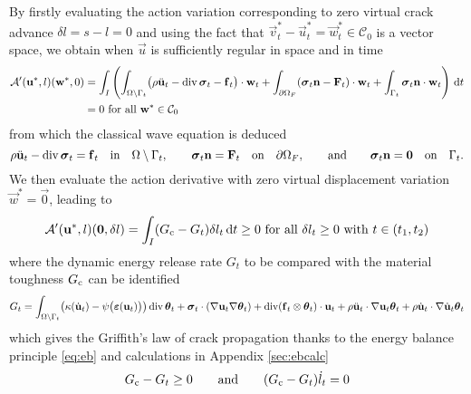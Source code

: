 By firstly evaluating the action variation corresponding to zero virtual crack advance $\delta l=s-l=0$ and using the fact that $\vec{v}_t^*-\vec{u}_t^*=\vec{w}_t^*\in\mathcal{C}_0$ is a vector space, we obtain when $\vec{u}$ is sufficiently regular in space and in time
\begin{equation} \label{eq:actionvariationzerocrackadvance}
\begin{aligned}
\mathcal{A}'(\vec{u}^*,l)(\vec{w}^*,0) &= \int_I\left(\int_\domaint\bigl(\rho\ddot{\vec{u}}_t-\div\sig_t-\vec{f}_t\bigr)\cdot\vec{w}_t+\int_{\partial\Omega_F}(\sig_t\vec{n}-\vec{F}_t)\cdot\vec{w}_t+\int_{\Gamma_t}\sig_t\vec{n}\cdot\vec{w}_t\right)\D{t} \\
&= 0\text{ for all $\vec{w}^*\in\mathcal{C}_0$}
\end{aligned}
\end{equation}
from which the classical wave equation is deduced
\begin{equation} \label{eq:classicalwave}
\rho\ddot{\vec{u}}_t-\div\sig_t=\vec{f}_t\quad\text{in}\quad\domaint,\qquad\sig_t\vec{n}=\vec{F}_t\quad\text{on}\quad\partial\Omega_F,\qquad\text{and}\qquad\sig_t\vec{n}=\vec{0}\quad\text{on}\quad\Gamma_t.
\end{equation}
We then evaluate the action derivative with zero virtual displacement variation $\vec{w}^*=\vec{0}$, leading to
\begin{equation} \label{eq:actionvariationzerodisplacement}
\mathcal{A}'(\vec{u}^*,l)(\vec{0},\delta l)=\int_I(\gc-G_t)\delta l_t\D{t}\geq 0\text{ for all $\delta l_t\geq 0$ with $t\in(t_1,t_2)$}
\end{equation}
where the dynamic energy release rate $G_t$ to be compared with the material toughness $G_\mathrm{c}$ can be identified 
\begin{equation} \label{eq:Gt}
G_t=\int_\domaint\bigl(\kappa(\dot{\vec{u}}_t)-\psi\bigl(\eps(\vec{u}_t)\bigr)\bigr)\div\vtheta_t+\sig_t\cdot(\nabla\vec{u}_t\nabla\vtheta_t)+\div(\vec{f}_t\otimes\vtheta_t)\cdot\vec{u}_t+\rho\ddot{\vec{u}}_t\cdot\nabla\vec{u}_t\vtheta_t+\rho\dot{\vec{u}}_t\cdot\nabla\dot{\vec{u}}_t\vtheta_t
\end{equation}
which gives the Griffith's law of crack propagation thanks to the energy balance principle \eqref{eq:eb} and calculations in Appendix \ref{sec:ebcalc}
\begin{equation} \label{eq:griffithslaw}
G_\mathrm{c}-G_t\geq 0\qquad\text{and}\qquad(G_\mathrm{c}-G_t)\dot{l}_t=0
\end{equation}

